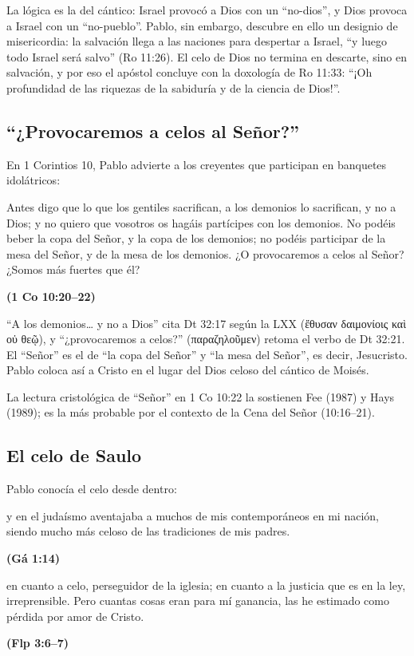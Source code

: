 \documentclass[11pt,letterpaper]{article}
\newcommand{\grc}[1]{\foreignlanguage{ancientgreek}{#1}}
\newcommand{\fuente}[1]{\par\hfill{\upshape\bfseries\small\textcolor{azul}{#1}}}
\begin{document}
La lógica es la del cántico: Israel provocó a Dios con un ``no-dios'', y Dios provoca a Israel con un ``no-pueblo''. Pablo, sin embargo, descubre en ello un designio de misericordia: la salvación llega a las naciones para despertar a Israel, ``y luego todo Israel será salvo'' (Ro 11:26). El celo de Dios no termina en descarte, sino en salvación, y por eso el apóstol concluye con la doxología de Ro 11:33: ``¡Oh profundidad de las riquezas de la sabiduría y de la ciencia de Dios!''.

\subsection{``¿Provocaremos a celos al Señor?''}
En 1 Corintios 10, Pablo advierte a los creyentes que participan en banquetes idolátricos:

\begin{cita}Antes digo que lo que los gentiles sacrifican, a los demonios lo sacrifican, y no a Dios; y no quiero que vosotros os hagáis partícipes con los demonios. No podéis beber la copa del Señor, y la copa de los demonios; no podéis participar de la mesa del Señor, y de la mesa de los demonios. ¿O provocaremos a celos al Señor? ¿Somos más fuertes que él?\fuente{(1 Co 10:20--22)}\end{cita}

``A los demonios\ldots{} y no a Dios'' cita Dt 32:17 según la LXX (\grc{ἔθυσαν δαιμονίοις καὶ οὐ θεῷ}), y ``¿provocaremos a celos?'' (\grc{παραζηλοῦμεν}) retoma el verbo de Dt 32:21. El ``Señor'' es el de ``la copa del Señor'' y ``la mesa del Señor'', es decir, Jesucristo. Pablo coloca así a Cristo en el lugar del Dios celoso del cántico de Moisés.

\begin{nota}[Precisión]
La lectura cristológica de ``Señor'' en 1 Co 10:22 la sostienen Fee (1987) y Hays (1989); es la más probable por el contexto de la Cena del Señor (10:16--21).
\end{nota}

\subsection{El celo de Saulo}
Pablo conocía el celo desde dentro:

\begin{cita}y en el judaísmo aventajaba a muchos de mis contemporáneos en mi nación, siendo mucho más celoso de las tradiciones de mis padres.\fuente{(Gá 1:14)}\end{cita}
\begin{cita}en cuanto a celo, perseguidor de la iglesia; en cuanto a la justicia que es en la ley, irreprensible. Pero cuantas cosas eran para mí ganancia, las he estimado como pérdida por amor de Cristo.\fuente{(Flp 3:6--7)}\end{cita}
\end{document}
